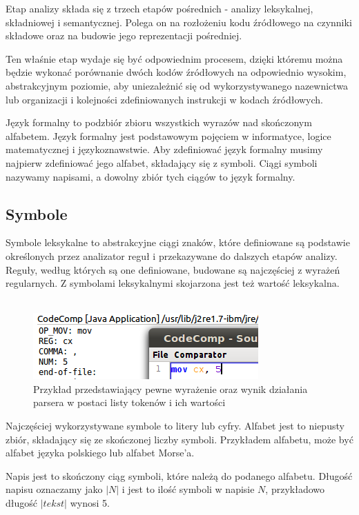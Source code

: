 \documentclass[a4paper,12pt]{article}
\begin{document}
Etap analizy składa się z trzech etapów pośrednich - analizy leksykalnej, składniowej i semantycznej. Polega on na rozłożeniu kodu źródłowego na czynniki składowe oraz na budowie jego reprezentacji pośredniej.

Ten właśnie etap wydaje się być odpowiednim procesem, dzięki któremu można będzie wykonać porównanie dwóch kodów źródłowych na odpowiednio wysokim, abstrakcyjnym poziomie, aby uniezależnić się od wykorzystywanego nazewnictwa lub organizacji i kolejności zdefiniowanych instrukcji w kodach źródłowych.

Język formalny to podzbiór zbioru wszystkich wyrazów nad skończonym alfabetem. Język formalny jest podstawowym pojęciem w informatyce, logice matematycznej i językoznawstwie. Aby zdefiniować język formalny musimy najpierw zdefiniować jego alfabet, składający się z symboli. Ciągi symboli nazywamy napisami, a dowolny zbiór tych ciągów to język formalny.

\subsection{Symbole}

Symbole leksykalne to abstrakcyjne ciągi znaków, które definiowane są podstawie określonych przez analizator reguł i przekazywane do dalszych etapów analizy. Reguły, według których są one definiowane, budowane są najczęściej z wyrażeń regularnych. Z symbolami leksykalnymi skojarzona jest też wartość leksykalna.
\\ \\
\begin{figure}[h!]
\centering
\includegraphics[scale=0.8]{gfx/tokens.png}
\caption{Przykład przedstawiający pewne wyrażenie oraz wynik działania parsera w postaci listy tokenów i ich wartości}
\end{figure}

Najczęściej wykorzystywane symbole to litery lub cyfry. Alfabet jest to niepusty zbiór, składający się ze skończonej liczby symboli. Przykładem alfabetu, może być alfabet języka polskiego lub alfabet Morse’a.

Napis jest to skończony ciąg symboli, które należą do podanego alfabetu. Długość napisu oznaczamy jako $|N|$ i jest to ilość symboli w napisie $N$, przykładowo długość $|tekst|$ wynosi 5.
\end{document}
